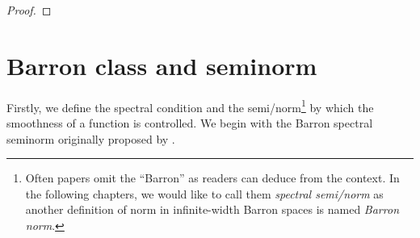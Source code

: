 \begin{proof}


\end{proof}

\section{Barron class and seminorm}

Firstly, we define the spectral condition and the semi/norm\footnote{
    Often papers omit the ``Barron'' as readers can deduce from the context. 
    In the following chapters, we would like to call them \textit{spectral 
    semi/norm} as another definition of norm in infinite-width Barron spaces is 
    named \textit{Barron norm}.
} by which the smoothness of a function
is controlled. We begin with the Barron spectral seminorm originally proposed
 by \cite{barronUniversalApproximationBounds1993}.


